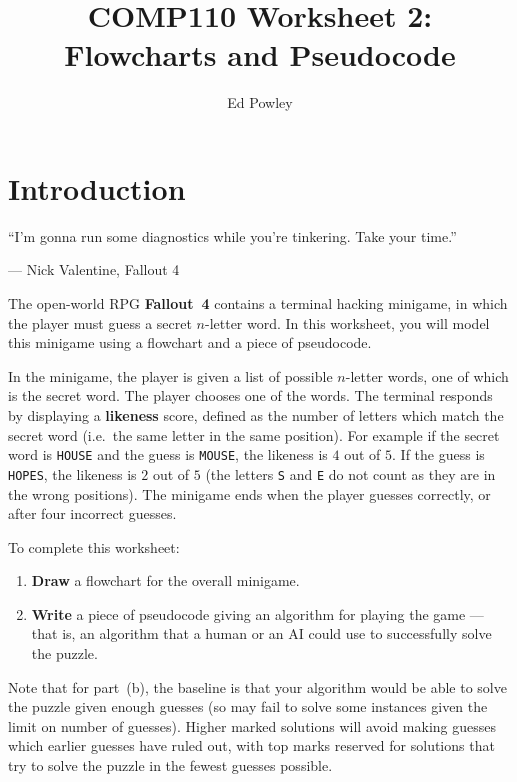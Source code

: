 \documentclass{../../../fal_assignment}
\title{COMP110 Worksheet 2: Flowcharts and Pseudocode}
\author{Ed Powley}
\begin{document}
\maketitle

\section*{Introduction}

\begin{marginquote}
``I'm gonna run some diagnostics while you're tinkering. Take your time.''

--- Nick Valentine, Fallout 4
\end{marginquote}

The open-world RPG \textbf{Fallout~4} contains a terminal hacking minigame, in which
the player must guess a secret $n$-letter word.
In this worksheet, you will model this minigame using a flowchart and a piece of pseudocode.

In the minigame, the player is given a list of possible $n$-letter words, one of which is the secret word.
The player chooses one of the words.
The terminal responds by displaying a \textbf{likeness} score,
defined as the number of letters which match the secret word (i.e.\ the same letter in the same position).
For example if the secret word is \texttt{HOUSE} and the guess is \texttt{MOUSE}, the likeness is $4$ out of $5$.
If the guess is \texttt{HOPES}, the likeness is $2$ out of $5$
(the letters \texttt{S} and \texttt{E} do not count as they are in the wrong positions).
The minigame ends when the player guesses correctly, or after four incorrect guesses.

To complete this worksheet:
\begin{enumerate}[label=(\alph*)]
	\item \textbf{Draw} a flowchart for the overall minigame.
	\item \textbf{Write} a piece of pseudocode giving an algorithm for playing the game
		--- that is, an algorithm that a human or an AI could use to successfully solve the puzzle.
\end{enumerate}

Note that for part~(b), the baseline is that your algorithm would be able to solve the puzzle given enough guesses (so may fail to solve some instances given the limit on number of guesses).
Higher marked solutions will avoid making guesses which earlier guesses have ruled out,
with top marks reserved for solutions that try to solve the puzzle in the fewest guesses possible.
\end{document}
